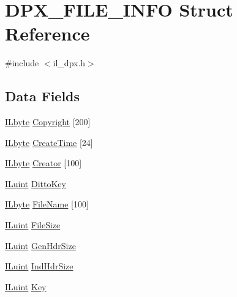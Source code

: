 \hypertarget{struct_d_p_x___f_i_l_e___i_n_f_o}{\section{D\-P\-X\-\_\-\-F\-I\-L\-E\-\_\-\-I\-N\-F\-O Struct Reference}
\label{struct_d_p_x___f_i_l_e___i_n_f_o}
}


{\ttfamily \#include $<$il\-\_\-dpx.\-h$>$}

\subsection*{Data Fields}
\begin{DoxyCompactItemize}
\item 
\hyperlink{il_8h_a88e562dacd22f4efcf6f9d31b85d4f92}{I\-Lbyte} \hyperlink{struct_d_p_x___f_i_l_e___i_n_f_o_aeeae0de36d95784d2022cdbbdd44b117}{Copyright} \mbox{[}200\mbox{]}
\item 
\hyperlink{il_8h_a88e562dacd22f4efcf6f9d31b85d4f92}{I\-Lbyte} \hyperlink{struct_d_p_x___f_i_l_e___i_n_f_o_a116699f30d8480a21d1f65f78a252995}{Create\-Time} \mbox{[}24\mbox{]}
\item 
\hyperlink{il_8h_a88e562dacd22f4efcf6f9d31b85d4f92}{I\-Lbyte} \hyperlink{struct_d_p_x___f_i_l_e___i_n_f_o_a8553e5314289c4ce9bb7efd6295a3aa1}{Creator} \mbox{[}100\mbox{]}
\item 
\hyperlink{il_8h_ac6508d0e9c19e32f32e00d54b5b8cf30}{I\-Luint} \hyperlink{struct_d_p_x___f_i_l_e___i_n_f_o_ad2e697713ab9937bcbdd151c73a181c4}{Ditto\-Key}
\item 
\hyperlink{il_8h_a88e562dacd22f4efcf6f9d31b85d4f92}{I\-Lbyte} \hyperlink{struct_d_p_x___f_i_l_e___i_n_f_o_a3edd297e799271498ddf74fb64cbdb00}{File\-Name} \mbox{[}100\mbox{]}
\item 
\hyperlink{il_8h_ac6508d0e9c19e32f32e00d54b5b8cf30}{I\-Luint} \hyperlink{struct_d_p_x___f_i_l_e___i_n_f_o_a084ea3a09519c0d60166debd1909c194}{File\-Size}
\item 
\hyperlink{il_8h_ac6508d0e9c19e32f32e00d54b5b8cf30}{I\-Luint} \hyperlink{struct_d_p_x___f_i_l_e___i_n_f_o_ae044ac2ee349f3f8f7cc56aea97a2d3c}{Gen\-Hdr\-Size}
\item 
\hyperlink{il_8h_ac6508d0e9c19e32f32e00d54b5b8cf30}{I\-Luint} \hyperlink{struct_d_p_x___f_i_l_e___i_n_f_o_a25d4be85732244e92cfad5d96d26bf92}{Ind\-Hdr\-Size}
\item 
\hyperlink{il_8h_ac6508d0e9c19e32f32e00d54b5b8cf30}{I\-Luint} \hyperlink{struct_d_p_x___f_i_l_e___i_n_f_o_a7ff9fd2e1d2c9d01aed719d449923b2c}{Key}

\end{DoxyCompactItemize}
